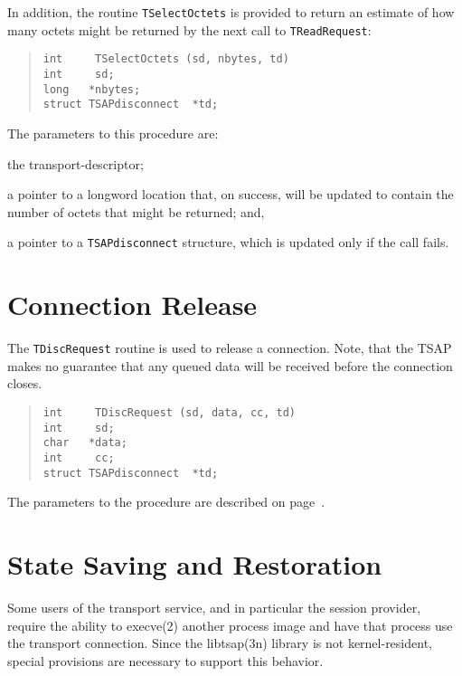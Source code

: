 In addition,
the routine \verb"TSelectOctets" is provided to return an estimate of how many
octets might be returned by the next call to \verb"TReadRequest":
\begin{quote}\small\begin{verbatim}
int     TSelectOctets (sd, nbytes, td)
int     sd;
long   *nbytes;
struct TSAPdisconnect  *td;
\end{verbatim}\end{quote}
The parameters to this procedure are:
\begin{describe}
\item[\verb"sd":] the transport-descriptor;

\item[\verb"nbytes":] a pointer to a longword location that, on success, will
be updated to contain the number of octets that might be returned;
and,

\item[\verb"td":] a pointer to a \verb"TSAPdisconnect" structure, which is
updated only if the call fails.
\end{describe}

\section	{Connection Release}
The \verb"TDiscRequest" routine is used to release a connection.
Note, that the TSAP makes no guarantee that any queued data will be received
before the connection closes.
\begin{quote}\small\begin{verbatim}
int     TDiscRequest (sd, data, cc, td)
int     sd;
char   *data;
int     cc;
struct TSAPdisconnect  *td;
\end{verbatim}\end{quote}
The parameters to the procedure are described on page~\pageref{TDiscRequest}.

\section	{State Saving and Restoration}
Some users of the transport service,
and in particular the session provider,
require the ability to \man execve(2) another process image and have that
process use the transport connection.
Since the \man libtsap(3n) library is not kernel-resident,
special provisions are necessary to support this behavior.

